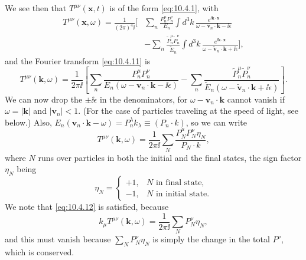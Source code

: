 We see then that \(T^{\mu\nu}(\mathbf{x},t)\) is of the form
\eqref{eq:10.4.1}, with
\begin{align*}
  T^{\mu\nu}(\mathbf{x},\omega)
  =\frac{1}{(2\pi)^4\ii}\Biggl[
  &\sum_n\frac{P_n^\mu P_n^\nu}{E_n}
  \int d^3k\,
  \frac{e^{\ii\mathbf{k}\cdot\mathbf{x}}}
       {\omega-\mathbf{v}_n\cdot\mathbf{k}-\ii\epsilon}\\
  &-\sum_n\frac{\widetilde P_n^\mu\widetilde P_n^\nu}{\widetilde E_n}
  \int d^3k\,
  \frac{e^{\ii\mathbf{k}\cdot\mathbf{x}}}
       {\omega-\widetilde{\mathbf{v}}_n\cdot\mathbf{k}
        +\ii\epsilon}
  \Biggr],
\end{align*}
and the Fourier transform \eqref{eq:10.4.11} is
\[
  T^{\mu\nu}(\mathbf{k},\omega)
  =
  \frac{1}{2\pi\ii}
  \left[
    \sum_n\frac{P_n^\mu P_n^\nu}
    {E_n(\omega-\mathbf{v}_n\cdot\mathbf{k}-\ii\epsilon)}
    -
    \sum_n\frac{\widetilde P_n^\mu\widetilde P_n^\nu}
    {\widetilde E_n
      (\omega-\widetilde{\mathbf{v}}_n\cdot\mathbf{k}+\ii\epsilon)}
  \right].
\]
We can now drop the \(\pm\ii\epsilon\) in the denominators, for
\(\omega-\mathbf{v}_n\cdot\mathbf{k}\) cannot vanish if
\(\omega=\lvert\mathbf{k}\rvert\) and
\(\lvert\mathbf{v}_n\rvert<1\). (For the case of particles traveling at
the speed of light, see below.) Also,
\(E_n(\mathbf{v}_n\cdot\mathbf{k}-\omega)
=P_n^\lambda k_\lambda\equiv(P_n\cdot k)\), so we can write
\begin{equation}
  T^{\mu\nu}(\mathbf{k},\omega)
  =
  \frac{1}{2\pi\ii}
  \sum_N
  \frac{P_N^\mu P_N^\nu\eta_N}{P_N\cdot k},
  \tag{10.4.21}\label{eq:10.4.21}
\end{equation}
where \(N\) runs over particles in both the initial and the final states,
the sign factor \(\eta_N\) being
\[
  \eta_N=
  \begin{cases}
  +1,&N\text{ in final state},\\
  -1,&N\text{ in initial state}.
  \end{cases}
\]
We note that \eqref{eq:10.4.12} is satisfied, because
\[
  k_\mu T^{\mu\nu}(\mathbf{k},\omega)
  =
  \frac{1}{2\pi\ii}\sum_NP_N^\nu\eta_N,
\]
and this must vanish because \(\sum_NP_N^\nu\eta_N\) is simply the change
in the total \(P^\nu\), which is conserved.

